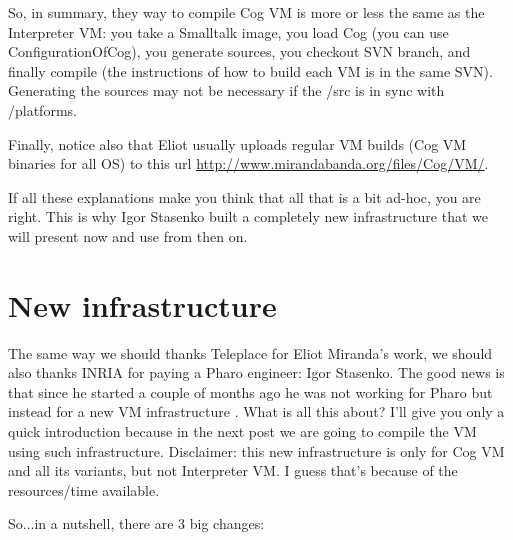 \documentclass[a4paper,10pt,twoside]{book}
\begin{document}
So, in summary, they way to compile Cog VM is more or less the same as the Interpreter VM: you take a Smalltalk image, you load Cog (you can use ConfigurationOfCog), you generate sources, you checkout SVN branch, and finally compile (the instructions of how to build each VM is in the same SVN). Generating the sources may not be necessary if the /src is in sync with /platforms.

Finally, notice also that Eliot usually uploads regular VM builds (Cog VM binaries for all OS) to this url \url{http://www.mirandabanda.org/files/Cog/VM/}.

If all these explanations make you think that all that is a bit ad-hoc, you are right. This is why Igor Stasenko built a completely new infrastructure that we will present now and use from then on. 







\section{New infrastructure}

The same way we should thanks Teleplace for Eliot Miranda's work, we should also thanks INRIA for paying a Pharo engineer: Igor Stasenko. The good news is that since he started a couple of months ago he was not working for Pharo but instead for a new VM infrastructure . What is all this about? I'll give you only a quick introduction because in the next post we are going to compile the VM using such infrastructure. Disclaimer: this new infrastructure is only for Cog VM and all its variants, but not Interpreter VM. I guess that's because of the resources/time available.

So...in a nutshell, there are 3 big changes:
\end{document}
